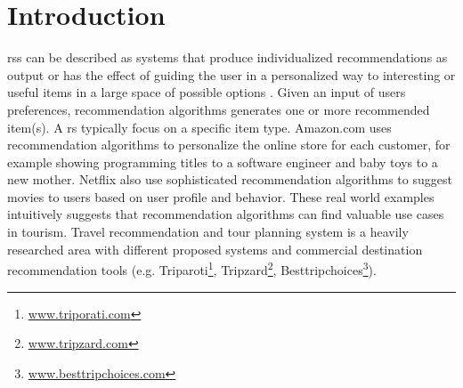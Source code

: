 

\chapter{Introduction}\label{chapter:introduction}
\Glspl{rs} can be described as systems that produce individualized recommendations
as output or has the effect of guiding the user in a personalized way to interesting
or useful items in a large space of possible options \parencite{Burke2002HybridInteraction}. Given an input of users preferences, recommendation algorithms generates one or more recommended item(s). A \gls{rs} typically focus on a specific item type. Amazon.com \parencite{} uses recommendation algorithms to personalize the online store for each customer, for example showing programming titles to a software engineer and baby toys to a new mother.  Netflix \parencite{Amatriain2013BigRecommendations} also use sophisticated recommendation algorithms to suggest movies to users based on user profile and behavior. These real world examples intuitively suggests that recommendation algorithms can find valuable use cases in tourism. Travel recommendation and tour planning system is a heavily researched area with different proposed systems \parencite{wolfgang_umap_recsystem, cbrecsys2014, Thiengburanathum2018AnTourists, Arif2020Blockchain-BasedSystem, Alrasheed2020ASystem} and commercial destination recommendation tools (e.g. Triparoti\footnote{\url{www.triporati.com}}, Tripzard\footnote{\url{www.tripzard.com}}, Besttripchoices\footnote{\url{www.besttripchoices.com}}).



